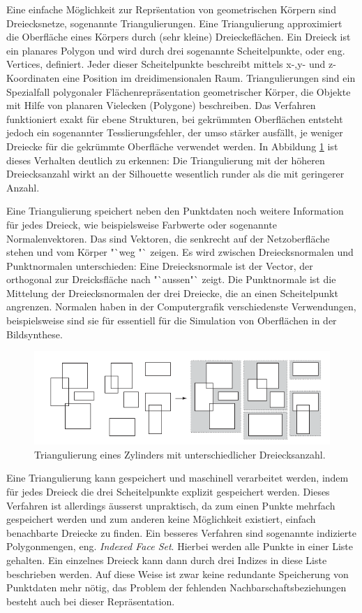 Eine einfache M\"oglichkeit zur Repr\"sentation von geometrischen K\"orpern sind Dreiecksnetze, sogenannte Triangulierungen. Eine Triangulierung approximiert die Oberfl\"ache eines K\"orpers durch (sehr kleine) Dreieckefl\"achen. Ein Dreieck ist ein planares Polygon und wird durch drei sogenannte Scheitelpunkte, oder eng. Vertices, definiert. Jeder dieser Scheitelpunkte beschreibt mittels x-,y- und z-Koordinaten eine Position im dreidimensionalen Raum. Triangulierungen sind ein Spezialfall polygonaler Flächenrepräsentation geometrischer K\"orper, die Objekte mit Hilfe von planaren Vielecken (Polygone) beschreiben. Das Verfahren funktioniert exakt f\"ur ebene Strukturen, bei gekrümmten Oberfl\"achen entsteht jedoch ein sogenannter Tesslierungsfehler, der umso stärker ausf\"allt, je weniger Dreiecke für die gekr\"ummte Oberfl\"ache verwendet werden. In Abbildung \ref{triangulation} ist dieses Verhalten deutlich zu erkennen: Die Triangulierung mit der h\"oheren Dreiecksanzahl wirkt an der Silhouette wesentlich runder als die mit geringerer Anzahl. 

Eine Triangulierung speichert neben den Punktdaten noch weitere Information f\"ur jedes Dreieck, wie beispielsweise Farbwerte oder sogenannte Normalenvektoren. Das sind Vektoren, die senkrecht auf der Netzoberfläche stehen und vom K\"orper  "`weg "` zeigen. Es wird zwischen Dreiecksnormalen und Punktnormalen unterschieden: Eine Dreiecksnormale ist der Vector, der orthogonal zur Dreicksfläche nach "`aussen"` zeigt. Die Punktnormale ist die Mittelung der  Dreiecksnormalen der drei Dreiecke, die an einen Scheitelpunkt angrenzen. Normalen haben in der Computergrafik verschiedenste Verwendungen, beispielsweise sind sie für essentiell f\"ur die Simulation von Oberfl\"achen in der Bildsynthese.

\begin{figure}[H]
\centerline{
	\includegraphics[width=0.7\columnwidth]{graphics/box.png}
}
\caption{Triangulierung eines Zylinders mit unterschiedlicher Dreiecksanzahl.}
\label{triangulation}
\end{figure}

Eine Triangulierung kann gespeichert und maschinell verarbeitet werden, indem f\"ur jedes Dreieck die drei Scheitelpunkte explizit gespeichert werden. Dieses Verfahren ist allerdings \"ausserst unpraktisch, da zum einen Punkte mehrfach gespeichert werden und zum anderen keine M\"oglichkeit existiert, einfach benachbarte Dreiecke zu finden. Ein besseres Verfahren sind sogenannte indizierte Polygonmengen, eng. \textit{Indexed Face Set}. Hierbei werden alle Punkte in einer Liste gehalten. Ein einzelnes Dreieck kann dann durch drei Indizes in diese Liste beschrieben werden. Auf diese Weise ist zwar keine redundante Speicherung von Punktdaten mehr n\"otig, das Problem der fehlenden Nachbarschaftsbeziehungen besteht auch bei dieser Repr\"asentation. 


